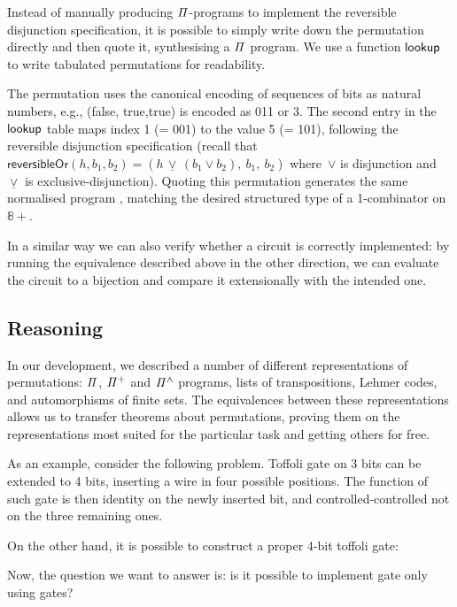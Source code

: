 Instead of manually producing $\mathit{\Pi}$-programs to implement the reversible disjunction specification, it is possible
to simply write down the permutation directly and then quote it, synthesising a $\mathit{\Pi}$ program. We use a function
$\operatorname{\mathsf{lookup}}$ to write tabulated permutations for readability.

\medskip
\resetperm{}

\noindent
The permutation uses the canonical encoding of sequences of bits as natural numbers, e.g., {(\textsf{false},
\textsf{true},\textsf{true})} is encoded as 011 or 3. The second entry in the $\operatorname{\mathsf{lookup}}$ table maps index 1 (= 001)
to the value 5 (= 101), following the reversible disjunction specification (recall that
$\mathsf{reversibleOr}(h,b_1,b_2) = (h \,\underline{\vee}\, (b_1 \vee b_2), ~b_1, ~b_2)$ where~$\vee$ is disjunction
and~$\underline{\vee}$ is exclusive-disjunction). Quoting this permutation generates the same normalised program
, matching the desired structured type of a 1-combinator on $\mathbb{8}+$. 

In a similar way we can also verify whether a circuit is correctly implemented: by running the equivalence described
above in the other direction, we can evaluate the circuit to a bijection and compare it extensionally with the intended
one.

\subsection{Reasoning}

In our development, we described a number of different representations of permutations: $\mathit{\Pi}$, $\mathit{{\Pi}^{+}}$ and $\mathit{{\Pi}^{\wedge}}$ programs, lists of
transpositions, Lehmer codes, and automorphisms of finite sets. The equivalences between these representations allows us
to transfer theorems about permutations, proving them on the representations most suited for the particular task and
getting others for free.

As an example, consider the following problem. Toffoli gate on 3 bits can be extended to 4 bits, inserting a wire in
four possible positions. The function of such gate is then identity on the newly inserted bit, and controlled-controlled
not on the three remaining ones.
\medskip
\extendedToffoli{}

\noindent
On the other hand, it is possible to construct a proper 4-bit toffoli gate:
\medskip
\toffoli{}

\noindent
Now, the question we want to answer is: is it possible to implement  gate only using  gates?

